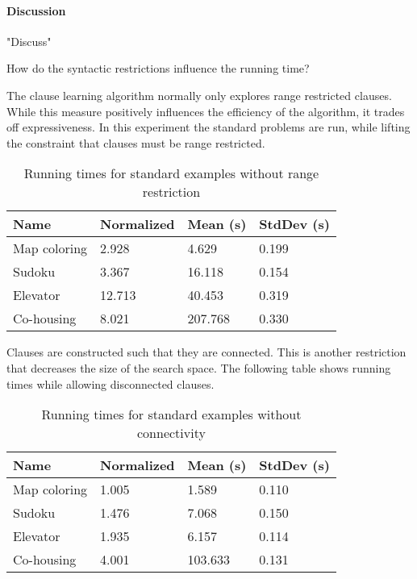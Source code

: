 \paragraph{Discussion}
"Discuss"

\begin{question}
	How do the syntactic restrictions influence the running time?
\end{question}

\begin{experiment}
	The clause learning algorithm normally only explores range restricted clauses.
	While this measure positively influences the efficiency of the algorithm, it trades off expressiveness.
	In this experiment the standard problems are run, while lifting the constraint that clauses must be range restricted.

	\begin{table}[!htp]
		\begin{tabularx}{\textwidth}{XXXX}
			\textbf{Name} 	& \textbf{Normalized}	& \textbf{Mean (s)}	& \textbf{StdDev (s)} \\
			\toprule
			Map coloring 	& 2.928					& 4.629				& 0.199 \\
			Sudoku 			& 3.367					& 16.118			& 0.154 \\
			Elevator 		& 12.713				& 40.453 			& 0.319 \\
			Co-housing 		& 8.021					& 207.768			& 0.330
		\end{tabularx}
		\label{tbl:exp_speed_no_range}
		\caption{Running times for standard examples without range restriction}
	\end{table}

\end{experiment}

\begin{experiment}
	Clauses are constructed such that they are connected.
	This is another restriction that decreases the size of the search space.
	The following table shows running times while allowing disconnected clauses.

	\begin{table}[!htp]
		\begin{tabularx}{\textwidth}{XXXX}
			\textbf{Name}	& \textbf{Normalized}	& \textbf{Mean (s)}	& \textbf{StdDev (s)} \\
			\toprule
			Map coloring 	& 1.005					& 1.589				& 0.110 \\
			Sudoku 			& 1.476					& 7.068				& 0.150 \\
			Elevator 		& 1.935					& 6.157 			& 0.114 \\
			Co-housing 		& 4.001					& 103.633			& 0.131
		\end{tabularx}
		\label{tbl:exp_speed_no_connect}
		\caption{Running times for standard examples without connectivity}
	\end{table}

\end{experiment}

